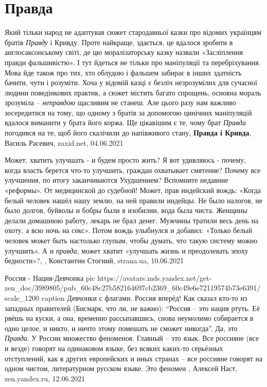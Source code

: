  
 
 
 
 
\chapter{Правда}

Який тільки народ не адаптував сюжет стародавньої казки про відомих українцям
братів \emph{Правду} і Кривду. Проте найкраще, здається, це вдалося зробити в
англосаксонському світі, де цю моралізаторську казку назвали «Засліплення
правди фальшивістю». І тут йдеться не тільки про маніпуляції та перебріхування.
Мова йде також про тих, хто облудою і фальшем забирає в інших здатність бачити,
чути і розуміти. Хоча у відомій казці є безліч незрозумілих для сучасної людини
поведінкових практик, а сюжет містить багато спрощень, основна мораль зрозуміла
– \emph{неправдою} щасливим не станеш. Але цього разу нам важливо зосередитися на
тому, що одному з братів за допомогою цинічних маніпуляцій вдалося виманити у
брата його коржа. Ще цікавішим є те, чому брат \emph{Правда} погодився на те, щоб його
скалічили до напівживого стану,
\textbf{Правда і Кривда}, Василь Расевич, zaxid.net, 04.06.2021

Может, хватить улучшать - и будем просто жить?  Я вот удивляюсь - почему, когда
власть берется что-то улучшить, граждан охватывает смятение? Почему все
улучшения, по итогу заканчиваются Ухудшением? Вспомните недавние «реформы». От
медицинской до судебной!  Может, прав индейский вождь: «Когда белый человек
нашёл нашу землю, на ней правили индейцы. Не было налогов, не было долгов,
буйволы и бобры были в изобилии, вода была чиста. Женщины делали домашнюю
работу, лекарь не брал денег. Мужчины тратили весь день на охоту, а всю ночь на
секс». Потом вождь улыбнулся и добавил: «Только белый человек может быть
настолько глупым, чтобы думать, что такую систему можно улучшить».  А и
\emph{правда}, может хватит «улучшать жизнь и преодолевать эпоху бедности»?,
, Константин Стогний, strana.ua, 10.06.2021

Россия - Нация-Девчонка
\ifcmt
	pic https://avatars.mds.yandex.net/get-zen_doc/3989805/pub_60c48c27b582164697cb2369_60c49e6e72119574b73e6391/scale_1200
  caption Девчонки с флагами. Россия вперёд!
\fi
Как сказал кто-то из западных правителей (Бисмарк, что ли, не важно):
\enquote{Россия -- это нация ртуть. Её рвёшь на куски, а она, временно
рассыпавшись, снова неумолимо собирается в одно целое, и никто, и ничто этому
помешать не сможет никогда}. Да, это \emph{Правда}. У России множество
феноменов. Главный -- это язык.  Все россияне (все и везде) говорят на
одинаковом языке, без всяких каких-то серьёзных отступлений, как в других
европейских и иных странах -- все россияне говорят на одном чистом,
литературном русском языке. Это феномен
, 
Алексей Наст, zen.yandex.ru, 12.06.2021
